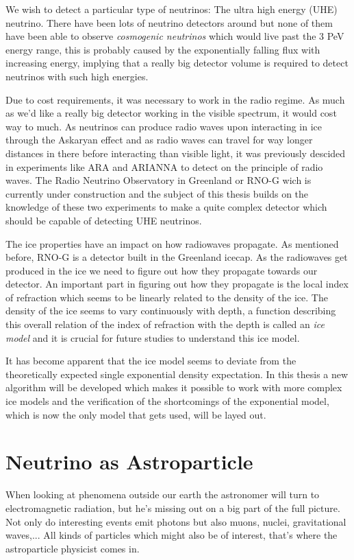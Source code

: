 \documentclass[11pt,a4paper,faculty=we,language=en,doctype=report]{cls/ugent-doc}
\begin{document}
We wish to detect a particular type of neutrinos: The ultra high energy (UHE)
neutrino.  There have been lots of neutrino detectors around but none of them
have been able to observe \textit{cosmogenic neutrinos} which would live past
the 3 PeV energy range, this is probably caused by the exponentially falling
flux with increasing energy, implying that a really big detector volume is
required to detect neutrinos with such high energies. 

Due to cost requirements, it was necessary to work in the radio regime.  As
much as we'd like a really big detector working in the visible spectrum, it
would cost way to much. As neutrinos can produce radio waves upon interacting
in ice through the Askaryan effect and as radio waves can travel for way longer
distances in there before interacting than visible light, it was previously
descided in experiments like ARA and ARIANNA to detect on the principle of
radio waves. The Radio Neutrino Observatory in Greenland or RNO-G wich is
currently under construction and the subject of this thesis builds on the
knowledge of these two experiments to make a quite complex detector which
should be capable of detecting UHE neutrinos.

The ice properties have an impact on how radiowaves propagate. As mentioned before, RNO-G is a detector built
in the Greenland icecap. As the radiowaves get produced in the ice we need to figure out how
they propagate towards our detector. An important part in figuring out how they propagate is 
the local index of refraction which seems to be linearly related to the density of the ice. 
The density of the ice seems to vary continuously with depth, a function describing
this overall relation of the index of refraction with the depth is called an \textit{ice model}
and it is crucial for future studies to understand this ice model.

It has become apparent that the ice model seems to deviate from the
theoretically expected single exponential density expectation.  In this thesis
a new algorithm will be developed which makes it possible to work with more
complex ice models and the verification of the shortcomings of the exponential
model, which is now the only model that gets used, will be layed out.


\chapter{Neutrino as Astroparticle}
When looking at phenomena outside our earth the astronomer will turn to
electromagnetic radiation, but he's missing out on a big part of the full
picture. Not only do interesting events emit photons but also muons, nuclei,
gravitational waves,... All kinds of particles which might also be of interest,
that's where the astroparticle physicist comes in.
\end{document}
